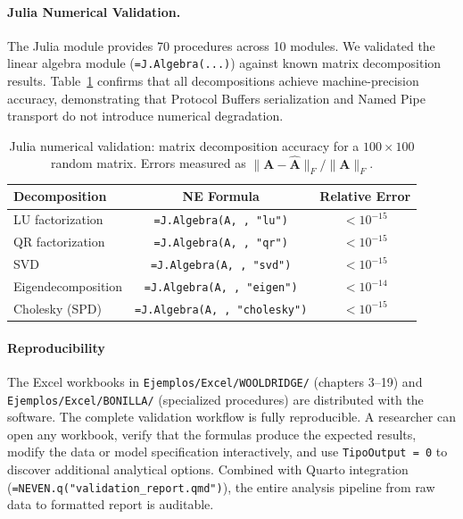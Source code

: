 \documentclass[preprint,12pt,authoryear]{elsarticle}
\newcommand{\neven}{NE\raisebox{0.2ex}{v}\rotatebox[origin=c]{180}{E}\rotatebox[origin=c]{180}{N}}
\begin{document}
\paragraph{Julia Numerical Validation.}
The Julia module provides 70 procedures across 10 modules. We validated the linear algebra module (\texttt{=J.Algebra(...)}) against known matrix decomposition results. Table~\ref{tab:julia_validation} confirms that all decompositions achieve machine-precision accuracy, demonstrating that Protocol Buffers serialization and Named Pipe transport do not introduce numerical degradation.

\begin{table}[htbp]
\centering
\caption{Julia numerical validation: matrix decomposition accuracy for a $100 \times 100$ random matrix. Errors measured as $\|\mathbf{A} - \hat{\mathbf{A}}\|_F / \|\mathbf{A}\|_F$.}
\label{tab:julia_validation}
\begin{tabular}{@{}lcc@{}}
\toprule
\textbf{Decomposition} & \textbf{\neven{} Formula} & \textbf{Relative Error} \\
\midrule
LU factorization    & \texttt{=J.Algebra(A, , "lu")}  & $< 10^{-15}$ \\
QR factorization    & \texttt{=J.Algebra(A, , "qr")}  & $< 10^{-15}$ \\
SVD                 & \texttt{=J.Algebra(A, , "svd")} & $< 10^{-15}$ \\
Eigendecomposition  & \texttt{=J.Algebra(A, , "eigen")} & $< 10^{-14}$ \\
Cholesky (SPD)      & \texttt{=J.Algebra(A, , "cholesky")} & $< 10^{-15}$ \\
\bottomrule
\end{tabular}
\end{table}

\paragraph{Reproducibility}
The Excel workbooks in \texttt{Ejemplos/Excel/WOOLDRIDGE/} (chapters 3--19) and \texttt{Ejemplos/Excel/BONILLA/} (specialized procedures) are distributed with the software. The complete validation workflow is fully reproducible. A researcher can open any workbook, verify that the formulas produce the expected results, modify the data or model specification interactively, and use \texttt{TipoOutput = 0} to discover additional analytical options. Combined with Quarto integration (\texttt{=NEVEN.q("validation\_report.qmd")}), the entire analysis pipeline from raw data to formatted report is auditable.
\end{document}
